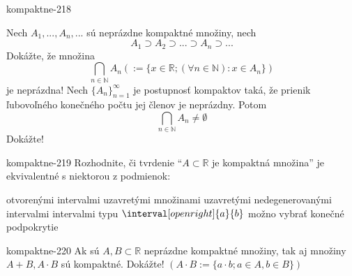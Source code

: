 \begin{defproblem}{kompaktne-218}
\begin{tasks}
\task
    Nech $A_1,...,A_n,...$ sú neprázdne kompaktné množiny, nech
    \[A_1 \supset A_2 \supset ... \supset A_n \supset ...\]
    Dokážte, že množina
    \[
        \bigcap_{n \in \mathbb{N}} A_n (:=\{x \in \mathbb{R};
        (\forall n \in \mathbb{N}): x \in A_n\})
    \]
    je neprázdna!
\task
    Nech ${\{A_n\}}_{n=1}^\infty$ je postupnosť kompaktov taká, že prienik
    ľubovoľného konečného počtu jej členov je neprázdny. Potom
    \[ \bigcap_{n \in \mathbb{N}} A_n \neq \emptyset \]
    Dokážte!
\end{tasks}
\end{defproblem}

\begin{defproblem}{kompaktne-219}
Rozhodnite, či tvrdenie \enquote{$A \subset \mathbb{R}$ je kompaktná množina} je
ekvivalentné s niektorou z podmienok:
\begin{tasks}
\task
    otvorenými intervalmi
\task
    uzavretými množinami
\task
    uzavretými nedegenerovanými intervalmi
\task
    intervalmi typu $\interval[open right]{a}{b}$ možno vybrať konečné
    podpokrytie
\end{tasks}
\end{defproblem}

\begin{defproblem}{kompaktne-220}
Ak sú $A,B \subset \mathbb{R}$ neprázdne kompaktné množiny, tak aj množiny
$A+B,A \cdot B$ sú kompaktné. Dokážte! $(A \cdot B :=\{a \cdot b; a \in A, b \in
B\})$
\end{defproblem}
